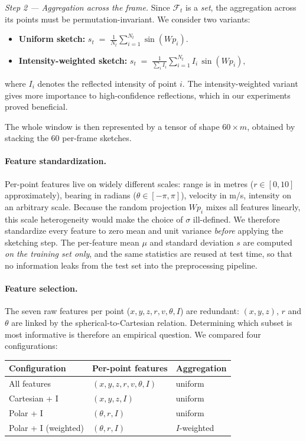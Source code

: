 \documentclass[10pt,twocolumn]{article}
\begin{document}
\emph{Step 2 --- Aggregation across the frame.} Since
$\mathcal{F}_t$ is a \emph{set}, the aggregation across its points must
be permutation-invariant. We consider two variants:
\begin{itemize}
    \item \textbf{Uniform sketch:}
    \(\displaystyle s_t \;=\; \frac{1}{N_t}\sum_{i=1}^{N_t} \sin(W p_i).\)
    \item \textbf{Intensity-weighted sketch:}
    \(\displaystyle s_t \;=\; \frac{1}{\sum_i I_i}\sum_{i=1}^{N_t} I_i\,\sin(W p_i),\)
\end{itemize}
where $I_i$ denotes the reflected intensity of point $i$. The
intensity-weighted variant gives more importance to high-confidence
reflections, which in our experiments proved beneficial.

The whole window is then represented by a tensor of shape
$60 \times m$, obtained by stacking the 60 per-frame sketches.

\paragraph{Feature standardization.}
Per-point features live on widely different scales: range is in metres
($r \in [0, 10]$ approximately), bearing in radians
($\theta \in [-\pi, \pi]$), velocity in m/s, intensity on an arbitrary
scale. Because the random projection $W p_i$ mixes all features
linearly, this scale heterogeneity would make the choice of $\sigma$
ill-defined. We therefore standardize every feature to zero mean and
unit variance \emph{before} applying the sketching step. The
per-feature mean $\mu$ and standard deviation $s$ are computed
\emph{on the training set only}, and the same statistics are reused at
test time, so that no information leaks from the test set into the
preprocessing pipeline.

\paragraph{Feature selection.}
The seven raw features per point ($x, y, z, r, v, \theta, I$) are
redundant: $(x, y, z)$, $r$ and $\theta$ are linked by the
spherical-to-Cartesian relation. Determining which subset is most
informative is therefore an empirical question. We compared four
configurations:

\begin{center}
\begin{tabular}{lll}
\toprule
Configuration       & Per-point features           & Aggregation \\
\midrule
All features        & $(x, y, z, r, v, \theta, I)$ & uniform \\
Cartesian + I       & $(x, y, z, I)$               & uniform \\
Polar + I           & $(\theta, r, I)$             & uniform \\
Polar + I (weighted)& $(\theta, r, I)$             & $I$-weighted \\
\bottomrule
\end{tabular}
\end{center}
\end{document}
